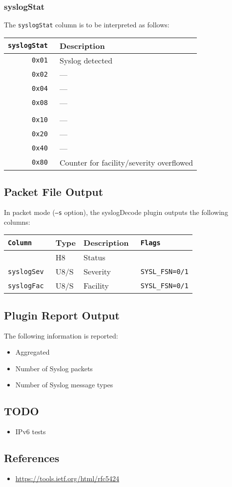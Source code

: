 \documentclass[documentation]{subfiles}
\begin{document}
\subsubsection{syslogStat}\label{syslogStat}
The {\tt syslogStat} column is to be interpreted as follows:
\begin{longtable}{>{\tt}rl}
    \toprule
    {\bf syslogStat} & {\bf Description}\\
    \midrule\endhead%
    0x01 & Syslog detected \\
    0x02 & --- \\
    0x04 & --- \\
    0x08 & --- \\
    \\
    0x10 & --- \\
    0x20 & --- \\
    0x40 & --- \\
    0x80 & Counter for facility/severity overflowed \\
    \bottomrule
\end{longtable}

\subsection{Packet File Output}
In packet mode ({\tt --s} option), the syslogDecode plugin outputs the following columns:
\begin{longtable}{>{\tt}lll>{\tt\small}l}
    \toprule
    {\bf Column} & {\bf Type} & {\bf Description} & {\bf Flags}\\
    \midrule\endhead%
    \nameref{syslogStat} & H8   & Status   & \\
    syslogSev            & U8/S & Severity & SYSL\_FSN=0/1\\
    syslogFac            & U8/S & Facility & SYSL\_FSN=0/1\\
    \bottomrule
\end{longtable}

\subsection{Plugin Report Output}
The following information is reported:
\begin{itemize}
    \item Aggregated {\tt{}}
    \item Number of Syslog packets
    \item Number of Syslog message types
\end{itemize}

\subsection{TODO}
\begin{itemize}
    \item IPv6 tests
\end{itemize}

\subsection{References}
\begin{itemize}
    \item \url{https://tools.ietf.org/html/rfc5424}
\end{itemize}
\end{document}

